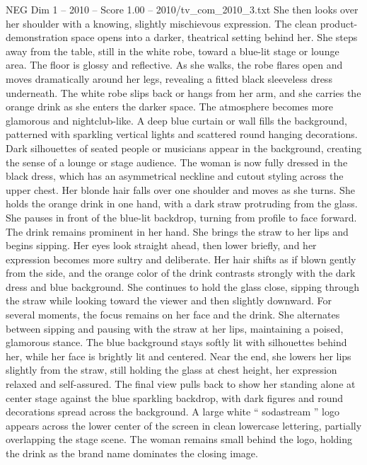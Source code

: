 \begin{textsample}{NEG Dim 1 – 2010 – Score 1.00 – 2010/tv\_com\_2010\_3.txt}
She then looks over her shoulder with a knowing, slightly mischievous expression.
The clean product-demonstration space opens into a darker, theatrical setting behind her.
She steps away from the table, still in the white robe, toward a blue-lit stage or lounge area.
The floor is glossy and reflective.
As she walks, the robe flares open and moves dramatically around her legs, revealing a fitted black sleeveless dress underneath.
The white robe slips back or hangs from her arm, and she carries the orange drink as she enters the darker space.
The atmosphere becomes more glamorous and nightclub-like.
A deep blue curtain or wall fills the background, patterned with sparkling vertical lights and scattered round hanging decorations.
Dark silhouettes of seated people or musicians appear in the background, creating the sense of a lounge or stage audience.
The woman is now fully dressed in the black dress, which has an asymmetrical neckline and cutout styling across the upper chest.
Her blonde hair falls over one shoulder and moves as she turns.
She holds the orange drink in one hand, with a dark straw protruding from the glass.
She pauses in front of the blue-lit backdrop, turning from profile to face forward.
The drink remains prominent in her hand.
She brings the straw to her lips and begins sipping.
Her eyes look straight ahead, then lower briefly, and her expression becomes more sultry and deliberate.
Her hair shifts as if blown gently from the side, and the orange color of the drink contrasts strongly with the dark dress and blue background.
She continues to hold the glass close, sipping through the straw while looking toward the viewer and then slightly downward.
For several moments, the focus remains on her face and the drink.
She alternates between sipping and pausing with the straw at her lips, maintaining a poised, glamorous stance.
The blue background stays softly lit with silhouettes behind her, while her face is brightly lit and centered.
Near the end, she lowers her lips slightly from the straw, still holding the glass at chest height, her expression relaxed and self-assured.
The final view pulls back to show her standing alone at center stage against the blue sparkling backdrop, with dark figures and round decorations spread across the background.
A large white “ sodastream ” logo appears across the lower center of the screen in clean lowercase lettering, partially overlapping the stage scene.
The woman remains small behind the logo, holding the drink as the brand name dominates the closing image.

\end{textsample}
